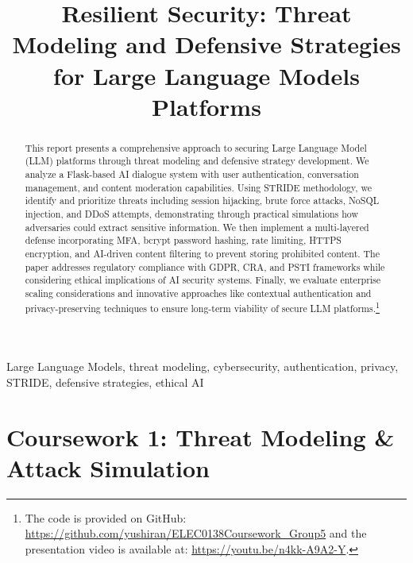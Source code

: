 \documentclass{article}
\title{Resilient Security: Threat Modeling and Defensive Strategies for Large Language Models Platforms}
\begin{document}
\maketitle
%
\begin{abstract}
    This report presents a comprehensive approach to securing Large Language Model (LLM) platforms through threat modeling and defensive strategy development. We analyze a Flask-based AI dialogue system with user authentication, conversation management, and content moderation capabilities. 
    Using STRIDE methodology, we identify and prioritize threats including session hijacking, brute force attacks, NoSQL injection, and DDoS attempts, demonstrating through practical simulations how adversaries could extract sensitive information. 
    We then implement a multi-layered defense incorporating MFA, bcrypt password hashing, rate limiting, HTTPS encryption, and AI-driven content filtering to prevent storing prohibited content. 
    The paper addresses regulatory compliance with GDPR\cite{GDPR2016}, CRA, and PSTI frameworks while considering ethical implications of AI security systems. 
    Finally, we evaluate enterprise scaling considerations and innovative approaches like contextual authentication and privacy-preserving techniques to ensure long-term viability of secure LLM platforms.\footnote{The code is provided on GitHub: \url{https://github.com/yushiran/ELEC0138Coursework_Group5} and the presentation video is available at: \url{https://youtu.be/n4kk-A9A2-Y}.}
\end{abstract}
%
\begin{keywords}
    Large Language Models, threat modeling, cybersecurity, authentication, privacy, STRIDE, defensive strategies, ethical AI
\end{keywords}

\section{Coursework 1: Threat Modeling \& Attack Simulation}
\end{document}
